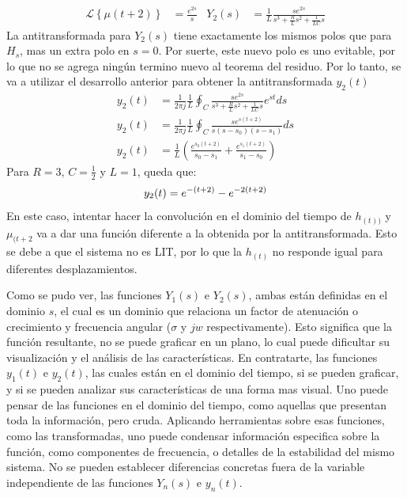\documentclass[12pt,a4paper]{report}
\begin{document}
\begin{enumerate}[label=\alph*)]
\begin{align*}
        \mathcal{L} \left\{\mu (t+2)\right\} &= \frac{e^{2s}}{s} &Y_2(s)
          &= \frac{1}{L} \frac{se^{2s}}{s^3 + \frac{R}{L} s^2 + \frac{1}{LC}s}
      \end{align*}
      La antitransformada para $Y_2(s)$ tiene exactamente los mismos polos que para $H_s$, mas un extra polo en $s = 0$.
      Por suerte, este nuevo polo es uno evitable, por lo que no se agrega ningún termino nuevo al teorema del residuo.
      Por lo tanto, se va a utilizar el desarrollo anterior para obtener la antitransformada $y_2(t)$
      \begin{align*}
        y_2(t) &= \frac{1}{2\pi j} \frac{1}{L} \oint_C \frac{se^{2s}}{s^3 + \frac{R}{L} s^2 + \frac{1}{LC}s} e^{st} ds\\[6pt]
        y_2(t) &= \frac{1}{2\pi j} \frac{1}{L} \oint_C \frac{se^{s(t+2)}}{s(s-s_0)(s-s_1)} ds\\[6pt]
        y_2(t) &= \frac{1}{L} \left(\frac{e^{s_0(t+2)}}{s_0 - s_1} + \frac{e^{s_1(t+2)}}{s_1 - s_0}\right)
      \end{align*}
      Para $R = 3$, $C = \frac{1}{2}$ y $L = 1$, queda que:
      \begin{equation*}
        y_2(t) = e^{-(t+2)} - e^{-2(t+2)}\\[6pt]
      \end{equation*}
      En este caso, intentar hacer la convolución en el dominio del tiempo de $h_{(t))}$ y $\mu_{(t+2}$ va a dar una
      función diferente a la obtenida por la antitransformada. Esto se debe a que el sistema no es LIT, por lo que la
      $h_{(t)}$ no responde igual para diferentes desplazamientos.

      Como se pudo ver, las funciones $Y_1(s)$ e $Y_2(s)$, ambas están definidas en el dominio $s$, el cual es un dominio
      que relaciona un factor de atenuación o crecimiento y frecuencia angular ($\sigma$ y $jw$ respectivamente). Esto
      significa que la función resultante, no se puede graficar en un plano, lo cual puede dificultar su visualización y
      el análisis de las características. En contratarte, las funciones $y_1(t)$ e $y_2(t)$, las cuales están en el
      dominio del tiempo, si se pueden graficar, y si se pueden analizar sus características de una forma mas visual. Uno
      puede pensar de las funciones en el dominio del tiempo, como aquellas que presentan toda la información, pero cruda.
      Aplicando herramientas sobre esas funciones, como las transformadas, uno puede condensar información especifica
      sobre la función, como componentes de frecuencia, o detalles de la estabilidad del mismo sistema. No se pueden
      establecer diferencias concretas fuera de la variable independiente de las funciones $Y_n(s)$ e $y_n(t)$.


\end{enumerate}
\end{document}
